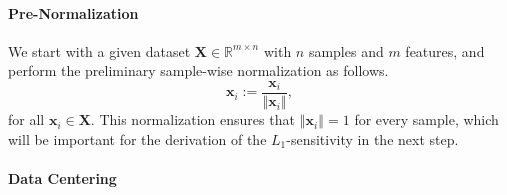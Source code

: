 \documentclass[USenglish,oneside,twocolumn]{article}
\theoremstyle{definition}
\theoremstyle{remark}
\theoremstyle{plain}
\theoremstyle{plain}
\begin{document}
\vspace{-1em}
\paragraph{Pre-Normalization}

We start with a given dataset $\mathbf{X}\in\mathbb{R}^{m\times n}$
with $n$ samples and $m$ features, and perform the preliminary sample-wise
normalization as follows.
\[
\mathbf{x}_{i}:=\frac{\mathbf{x}_{i}}{\left\Vert \mathbf{x}_{i}\right\Vert },
\]
for all $\mathbf{x}_{i}\in\mathbf{X}$. This normalization ensures
that $\left\Vert \mathbf{x}_{i}\right\Vert =1$ for every sample,
which will be important for the derivation of the $L_{1}$-sensitivity in the next step.

\vspace{-1em}
\paragraph{Data Centering}
\end{document}
